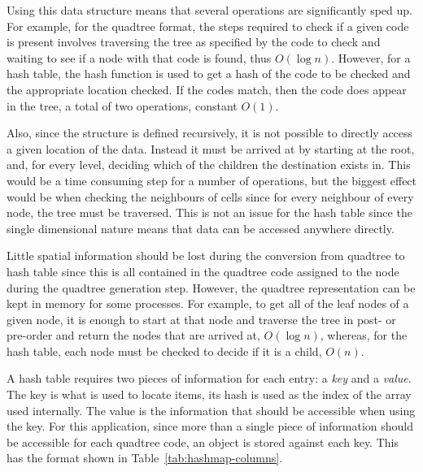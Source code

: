 Using this data structure means that several operations are significantly sped
up. For example, for the quadtree format, the steps required to check if a
given code is present involves traversing the tree as specified by the code to
check and waiting to see if a node with that code is found, thus $O(\log n)$.
However, for a hash table, the hash function is used to get a hash of the code
to be checked and the appropriate location checked. If the codes match, then
the code does appear in the tree, a total of two operations, constant $O(1)$.

Also, since the structure is defined recursively, it is not possible to
directly access a given location of the data. Instead it must be arrived at by
starting at the root, and, for every level, deciding which of the children the
destination exists in. This would be a time consuming step for a number of
operations, but the biggest effect would be when checking the neighbours of
cells since for every neighbour of every node, the tree must be traversed. This
is not an issue for the hash table since the single dimensional nature means
that data can be accessed anywhere directly.

Little spatial information should be lost during the conversion from quadtree
to hash table since this is all contained in the quadtree code assigned to the
node during the quadtree generation step. However, the quadtree representation
can be kept in memory for some processes. For example, to get all of the leaf
nodes of a given node, it is enough to start at that node and traverse the tree
in post- or pre-order and return the nodes that are arrived at, $O(\log n)$,
whereas, for the hash table, each node must be checked to decide if it is a
child, $O(n)$.

A hash table requires two pieces of information for each entry: a \emph{key}
and a \emph{value}. The key is what is used to locate items, its hash is used
as the index of the array used internally. The value is the information that
should be accessible when using the key. For this application, since more than
a single piece of information should be accessible for each quadtree code, an
object is stored against each key. This has the format shown in
Table~\ref{tab:hashmap-columns}.

